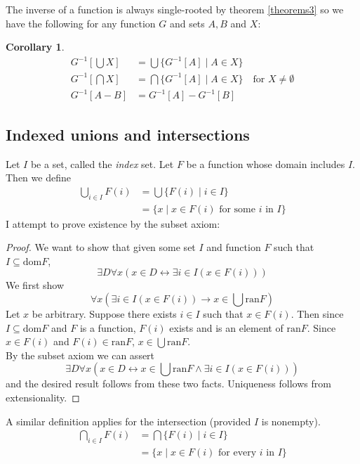 \documentclass{report}
\newtheorem{corollary}[theo]{Corollary}
\begin{document}
\noindent The inverse of a function is always single-rooted by theorem \ref{theorems3} so we have the following for any function $G$ and sets $A,B$ and $X$:
\begin{corollary}
\begin{align*}
G^{-1}[\bigcup X]&=\bigcup\{G^{-1}[A]\mid A\in X\}\\
G^{-1}[\bigcap X]&=\bigcap\{G^{-1}[A]\mid A\in X\}\quad\text{for }X\neq\emptyset\\
G^{-1}[A-B]&=G^{-1}[A]-G^{-1}[B]
\end{align*}
\end{corollary}
\newpage

\subsection{Indexed unions and intersections}
Let $I$ be a set, called the \textit{index} set. Let $F$ be a function whose domain includes $I$. Then we define
\begin{align*}
\bigcup_{i\in I}F(i)&=\bigcup\{F(i)\mid i\in I\}\\
&=\{x\mid x\in F(i)\text{ for some $i$ in $I$}\}
\end{align*}
I attempt to prove existence by the subset axiom:
\begin{proof}
We want to show that given some set $I$ and function $F$ such that $I\subseteq\text{dom}F$,
\begin{equation*}
\exists D\forall x(x\in D\leftrightarrow\exists i\in I(x\in F(i)))
\end{equation*}
We first show
\begin{equation*}
\forall x(\exists i\in I(x\in F(i))\to x\in\bigcup\text{ran}F)
\end{equation*}
Let $x$ be arbitrary. Suppose there exists $i\in I$ such that $x\in F(i)$. Then since $I\subseteq\text{dom}F$ and $F$ is a function, $F(i)$ exists and is an element of $\text{ran}F$.
Since $x\in F(i)$ and $F(i)\in\text{ran}F$, $x\in\bigcup\text{ran}F$.\\
\indent By the subset axiom we can assert
\begin{equation*}
\exists D\forall x(x\in D\leftrightarrow x\in\bigcup\text{ran}F\land\exists i\in I(x\in F(i)))
\end{equation*}
and the desired result follows from these two facts. Uniqueness follows from extensionality.
\end{proof}
\noindent A similar definition applies for the intersection (provided $I$ is nonempty).
\begin{align*}
\bigcap_{i\in I}F(i)&=\bigcap\{F(i)\mid i\in I\}\\
&=\{x\mid x\in F(i)\text{ for every $i$ in $I$}\}
\end{align*}
\end{document}
